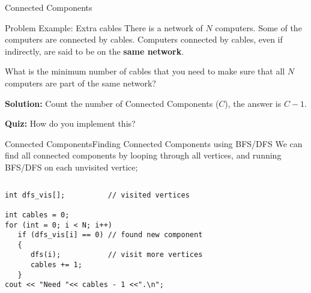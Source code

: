 \begin{frame}{Connected Components}
  \begin{block}{Problem Example: Extra cables}
    There is a network of $N$ computers. Some of the computers are connected by cables. Computers connected by cables, even if indirectly, are said to be on the {\bf same network}.
    \bigskip

    What is the minimum number of cables that you need to make sure that all $N$ computers are part of the same network?
  \end{block}\bigskip

  {\bf Solution:} Count the number of Connected Components ($C$), the answer is $C-1$.\bigskip

  {\bf Quiz:} How do you implement this?
\end{frame}

\begin{frame}[fragile]{Connected Components}{Finding Connected Components using BFS/DFS}
  We can find all connected components by looping through all vertices, and running BFS/DFS on each unvisited vertice;

\begin{columns}
  \begin{exampleblock}{}
\begin{verbatim}
int dfs_vis[];          // visited vertices

int cables = 0;
for (int = 0; i < N; i++)
   if (dfs_vis[i] == 0) // found new component
   {
      dfs(i);           // visit more vertices
      cables += 1;
   }
cout << "Need "<< cables - 1 <<".\n";
\end{verbatim}
  \end{exampleblock}
  \begin{center}
\end{center}
\end{columns}

\end{frame}

%
%
%

